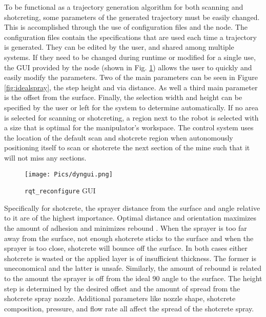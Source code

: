 To be functional as a trajectory generation algorithm for both scanning and shotcreting, some parameters of the generated trajectory must be easily changed. This is accomplished through the use of configuration files and the  node. The configuration files contain the specifications that are used each time a trajectory is generated. They can be edited by the user, and shared among multiple systems. If they need to be changed during runtime or modified for a single use, the GUI provided by the  node (shown in Fig. \ref{fig:dyngui}) allows the user to quickly and easily modify the parameters. Two of the main parameters can be seen in Figure \ref{fig:idealspray}, the step height and via distance. As well a third main parameter is the offset from the surface. Finally, the selection width and height can be specified by the user or left for the system to determine automatically. If no area is selected for scanning or shotcreting, a region next to the robot is selected with a size that is optimal for the manipulator's workspace. The control system uses the location of the default scan and shotcrete region when autonomously positioning itself to scan or shotcrete the next section of the mine such that it will not miss any sections.\\

\begin{figure}[h]
    \centering
    \texttt{[image: Pics/dyngui.png]}
    \caption{\texttt{rqt\_reconfigure} GUI}
    \label{fig:dyngui}
\end{figure}

Specifically for shotcrete, the sprayer distance from the surface and angle relative to it are of the highest importance. Optimal distance and orientation maximizes the amount of adhesion and minimizes rebound  \cite{spraypat}. When the sprayer is too far away from the surface, not enough shotcrete sticks to the surface and when the sprayer is too close, shotcrete will bounce off the surface. In both cases either shotcrete is wasted or the applied layer is of insufficient thickness. The former is uneconomical and the latter is unsafe. Similarly, the amount of rebound is related to the amount the sprayer is off from the ideal 90\degree\hspace{0pt} angle to the surface. The height step is determined by the desired offset and the amount of spread from the shotcrete spray nozzle.  Additional parameters like nozzle shape, shotcrete composition, pressure, and flow rate all affect the spread of the shotcrete spray.\\


